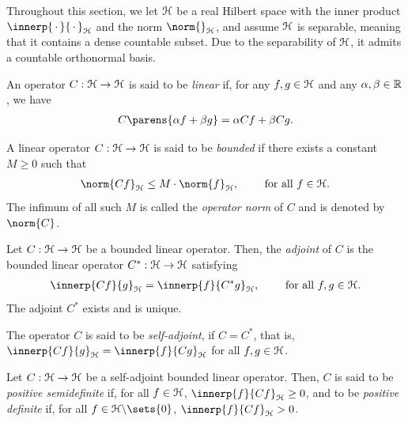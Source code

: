 Throughout this section, we let $\mathcal{H}$ be a real Hilbert space with the inner product $\innerp{\,\cdot\,}{\,\cdot\,}_{\calH}$ and the norm $\norm{}_{\calH}$, and assume $\mathcal{H}$ is separable, meaning that it contains a dense countable subset. Due to the separability of $\mathcal{H}$, it admits a countable orthonormal basis. 

\begin{definition}
	An operator $C: \mathcal{H} \to \mathcal{H}$ is said to be \textit{linear} if, for any $f, g \in \mathcal{H}$ and any $\alpha, \beta \in \mathbb{R}$, we have 
	\begin{align*}
		C \parens{\alpha f + \beta g} = \alpha C f + \beta C g. 
	\end{align*}
\end{definition}

\begin{definition}
	A linear operator $C: \mathcal{H} \to \mathcal{H}$ is said to be \textit{bounded} if there exists a constant $M \ge 0$ such that 
	\begin{align*}
		\norm{C f}_{\calH} \le M \cdot \norm{f}_{\calH}, \qquad \text{ for all } f \in \calH. 
	\end{align*}
	The infimum of all such $M$ is called the \textit{operator norm} of $C$ and is denoted by $\norm{C}$. 
\end{definition}

\begin{definition}
	Let $C: \mathcal{H} \to \mathcal{H}$ be a bounded linear operator. Then, the \textit{adjoint} of $C$ is the bounded linear operator $C^*: \mathcal{H} \to \mathcal{H}$ satisfying 
	\begin{align*}
		\innerp{Cf}{g}_{\calH} = \innerp{f}{C^*g}_{\calH}, \qquad \text{ for all } f, g \in \calH. 
	\end{align*}
	The adjoint $C^*$ exists and is unique. 
	
	The operator $C$ is said to be \textit{self-adjoint}, if $C = C^*$, that is, $\innerp{Cf}{g}_{\calH} = \innerp{f}{Cg}_{\calH}$ for all $f, g \in \mathcal{H}$. 
\end{definition}

\begin{definition}
	Let $C: \mathcal{H} \to \mathcal{H}$ be a self-adjoint bounded linear operator. Then, $C$ is said to be \textit{positive semidefinite} if, for all $f \in \mathcal{H}$, $\innerp{f}{Cf}_{\calH} \ge 0$, and to be \textit{positive definite} if, for all $f \in \calH \backslash \sets{0}$, $\innerp{f}{Cf}_{\calH} > 0$. 
\end{definition}


